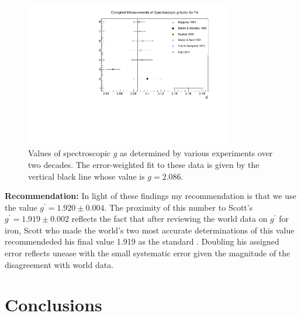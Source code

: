 \documentclass[12pt]{article}
\begin{document}
\begin{figure}[h]
\centering
\includegraphics[width=0.8\textwidth]{gfactor_world_data_Fe.pdf}
\caption{Values of spectroscopic $g$ as determined by various experiments over two decades. The error-weighted fit to these data is given by the vertical black line whose value is $g=2.086$.}
\label{fig:gfactor_world_data_Fe}
\end{figure}

{\bf Recommendation:} In light of these findings my recommendation is that we use the value {\bf $g^{\prime}=1.920\pm0.004$}. The proximity of this number to Scott's $g^{\prime}=1.919\pm0.002$ reflects the fact that after reviewing the world data on $g^{\prime}$ for iron, Scott who made the world's two most accurate determinations of this value recommendeded his final value 1.919 as the standard \cite{Scott1962}. Doubling his assigned error reflects unease with the small systematic error given the magnitude of the disagreement with world data.

\section{Conclusions}\label{conclusions}


%


\end{document}
